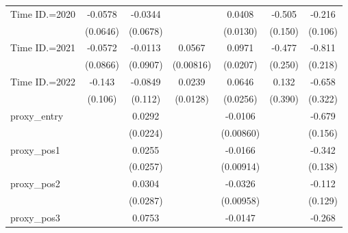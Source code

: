 {\begin{tabular}{l*{6}{c}}
\addlinespace
Time ID.=2020       &     -0.0578         &     -0.0344         &                     &      0.0408\sym{***}&      -0.505\sym{***}&      -0.216\sym{**} \\
                    &    (0.0646)         &    (0.0678)         &                     &    (0.0130)         &     (0.150)         &     (0.106)         \\
\addlinespace
Time ID.=2021       &     -0.0572         &     -0.0113         &      0.0567\sym{***}&      0.0971\sym{***}&      -0.477\sym{*}  &      -0.811\sym{***}\\
                    &    (0.0866)         &    (0.0907)         &   (0.00816)         &    (0.0207)         &     (0.250)         &     (0.218)         \\
\addlinespace
Time ID.=2022       &      -0.143         &     -0.0849         &      0.0239\sym{*}  &      0.0646\sym{**} &       0.132         &      -0.658\sym{**} \\
                    &     (0.106)         &     (0.112)         &    (0.0128)         &    (0.0256)         &     (0.390)         &     (0.322)         \\
\addlinespace
proxy\_entry         &                     &      0.0292         &                     &     -0.0106         &                     &      -0.679\sym{***}\\
                    &                     &    (0.0224)         &                     &   (0.00860)         &                     &     (0.156)         \\
\addlinespace
proxy\_pos1          &                     &      0.0255         &                     &     -0.0166\sym{*}  &                     &      -0.342\sym{**} \\
                    &                     &    (0.0257)         &                     &   (0.00914)         &                     &     (0.138)         \\
\addlinespace
proxy\_pos2          &                     &      0.0304         &                     &     -0.0326\sym{***}&                     &      -0.112         \\
                    &                     &    (0.0287)         &                     &   (0.00958)         &                     &     (0.129)         \\
\addlinespace
proxy\_pos3          &                     &      0.0753\sym{**} &                     &     -0.0147\sym{*}  &                     &      -0.268\sym{**} \\

\end{tabular}}
